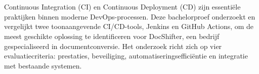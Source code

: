 
%
%
%
%
%

%



\chapter*{}

Continuous Integration (CI) en Continuous Deployment (CD) zijn essentiële praktijken binnen moderne DevOps-processen. Deze bachelorproef onderzoekt en vergelijkt twee toonaangevende CI/CD-tools, Jenkins en GitHub Actions, om de meest geschikte oplossing te identificeren voor DocShifter, een bedrijf gespecialiseerd in documentconversie. Het onderzoek richt zich op vier evaluatiecriteria: prestaties, beveiliging, automatiseringsefficiëntie en integratie met bestaande systemen.\\

